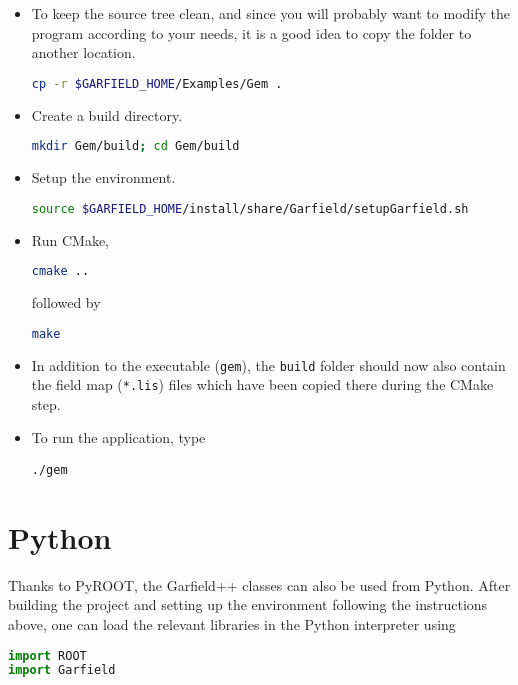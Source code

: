 \begin{itemize}
  \item
  To keep the source tree clean, and since you will probably want to modify 
  the program according to your needs, it is a good idea to copy 
  the folder to another location.
\begin{lstlisting}[language=bash]
cp -r $GARFIELD_HOME/Examples/Gem .
\end{lstlisting} 
  \item
  Create a build directory.
\begin{lstlisting}[language=bash]
mkdir Gem/build; cd Gem/build
\end{lstlisting} 
  \item
  Setup the environment.
\begin{lstlisting}[language=bash]
source $GARFIELD_HOME/install/share/Garfield/setupGarfield.sh
\end{lstlisting}
  \item
  Run CMake,
\begin{lstlisting}[language=bash]
cmake ..
\end{lstlisting} 
  followed by
\begin{lstlisting}[language=bash]
make
\end{lstlisting}
  \item
  In addition to the executable (\texttt{gem}), the \texttt{build} 
  folder should now also contain the field map (\texttt{*.lis}) 
  files which have been copied there during the CMake step.
  \item
  To run the application, type
\begin{lstlisting}
./gem
\end{lstlisting}
\end{itemize}

\section{Python}
Thanks to PyROOT, the Garfield++ classes can also be used from Python.
After building the project and setting up the environment 
following the instructions above, one can load the relevant libraries 
in the Python interpreter using
\begin{lstlisting}[language=python]
import ROOT
import Garfield
\end{lstlisting} 

